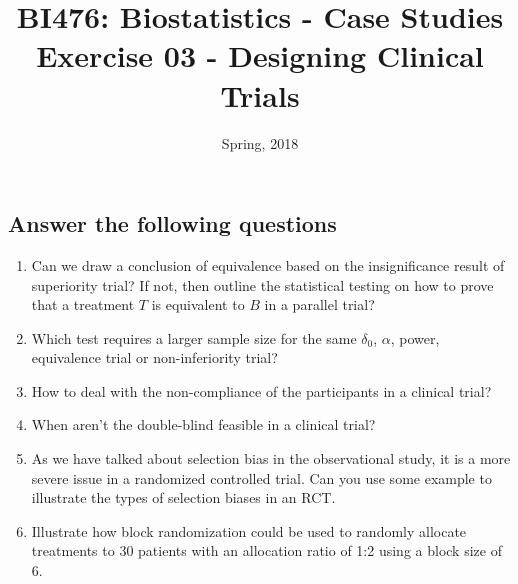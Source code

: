 \documentclass[a4paper,11pt]{article}
\title{\small{BI476: Biostatistics - Case Studies}\\
	\Large{Exercise 03 - Designing Clinical Trials}
}
\author{Spring, 2018}
\date{}
\begin{document}
\begin{CJK*}{UTF8}{gbsn}
\maketitle

\section{Answer the following questions}
\begin{enumerate}[(1)]
	\item Can we draw a conclusion of equivalence based on the insignificance result 
		of superiority trial? If not, then outline the statistical testing on how 
		to prove that a treatment $T$ is equivalent to $B$ in a parallel trial?
	\item Which test requires a larger sample size for the same $\delta_0$, $\alpha$, 
		power, equivalence trial or non-inferiority trial?
	\item How to deal with the non-compliance of the participants in a clinical trial?
	\item When aren't the double-blind feasible in a clinical trial?
	\item As we have talked about selection bias in the observational study, it is a 
		more severe issue in a randomized controlled trial. Can you use some 
		example to illustrate the types of selection biases in an RCT.
	\item Illustrate how block randomization could be used to randomly allocate 
		treatments to 30 patients with an allocation ratio of 1:2 using a block 
		size of 6.
\end{enumerate}


\end{CJK*}
\end{document}
